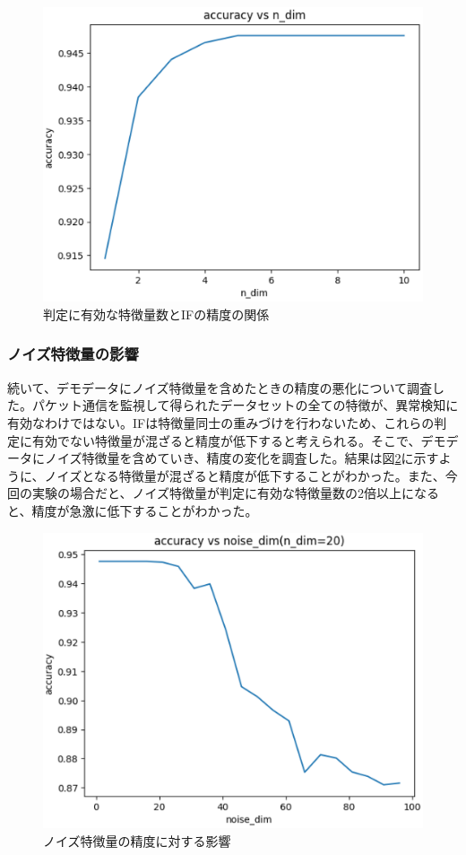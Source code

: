\documentclass{css}
\begin{document}
\begin{figure}[ht]
    \centering
    \includegraphics[width=0.9\linewidth]{pictures/eps/dim_vs_accu.eps}
    \caption{判定に有効な特徴量数とIFの精度の関係}
    \label{fig:dim_vs_accu}
\end{figure}

\subsubsection{ノイズ特徴量の影響}
続いて、デモデータにノイズ特徴量を含めたときの精度の悪化について調査した。パケット通信を監視して得られたデータセットの全ての特徴が、異常検知に有効なわけではない。IFは特徴量同士の重みづけを行わないため、これらの判定に有効でない特徴量が混ざると精度が低下すると考えられる。そこで、デモデータにノイズ特徴量を含めていき、精度の変化を調査した。結果は図\ref{fig:noise_accu}に示すように、ノイズとなる特徴量が混ざると精度が低下することがわかった。また、今回の実験の場合だと、ノイズ特徴量が判定に有効な特徴量数の2倍以上になると、精度が急激に低下することがわかった。

\begin{figure}[ht]
    \centering
    \includegraphics[width=0.9\linewidth]{pictures/eps/noise_accu.eps}
    \caption{ノイズ特徴量の精度に対する影響}
    \label{fig:noise_accu}
\end{figure}
\end{document}
